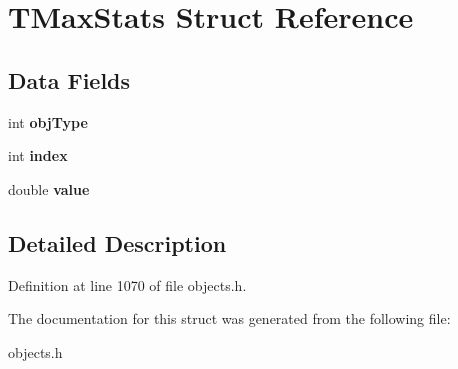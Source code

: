 \hypertarget{struct_t_max_stats}{}\section{T\+Max\+Stats Struct Reference}
\label{struct_t_max_stats}
\subsection*{Data Fields}
\begin{DoxyCompactItemize}
\item 
\mbox{\label{struct_t_max_stats_a42318eee653c4c76ccf9896d00e45a17}} 
int {\bfseries obj\+Type}
\item 
\mbox{\label{struct_t_max_stats_a750b5d744c39a06bfb13e6eb010e35d0}} 
int {\bfseries index}
\item 
\mbox{\label{struct_t_max_stats_aee90379adb0307effb138f4871edbc5c}} 
double {\bfseries value}
\end{DoxyCompactItemize}


\subsection{Detailed Description}


Definition at line 1070 of file objects.\+h.



The documentation for this struct was generated from the following file\+:\begin{DoxyCompactItemize}
\item 
objects.\+h\end{DoxyCompactItemize}
